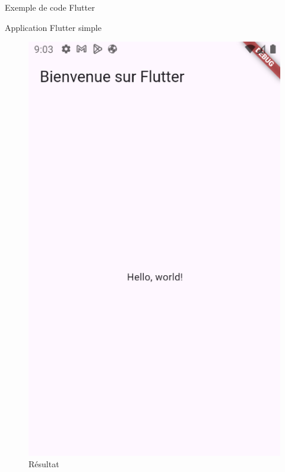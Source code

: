 \documentclass{clbeamer2024}
\begin{document}
\begin{frame}{Exemple de code Flutter}
\begin{exampleblock}{Application Flutter simple}
\begin{figure}[h]
\begin{minipage}{0.3\textwidth}
						\includegraphics[width=\linewidth]{test/resultat.png}
						\caption{Résultat}
						\label{fig:image2}
					\end{minipage}
				\end{figure}
				
				
			\end{exampleblock}
			
			
		\end{frame}
		
		
\end{document}
